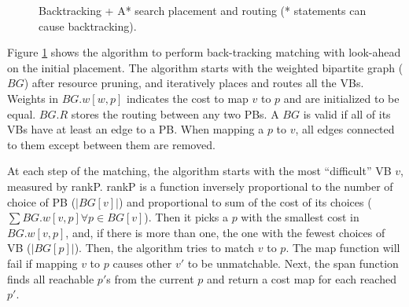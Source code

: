 \begin{figure}[!ht]
  \raggedleft
  \caption{Backtracking + A* search placement and routing (* statements can cause backtracking).}
  \label{alg:backtrack}
\end{figure}

Figure \ref{alg:backtrack} shows the algorithm to perform back-tracking matching with look-ahead on the initial
placement. The algorithm starts with the weighted bipartite graph ($BG$) after resource pruning, and iteratively
places and routes all the VBs. Weights in $BG.w[w,p]$ indicates the cost to map $v$ to $p$ and are initialized to be
equal. $BG.R$ stores the routing between any two PBs. A $BG$ is valid if all of its VBs have at least an edge to a PB.
When mapping a $p$ to $v$, all edges connected to them except between them are removed. 

At each step of the matching, the algorithm starts with the most ``difficult'' VB $v$, measured by
{\sc rankP}. {\sc rankP} is a function inversely proportional to the number of choice of PB ($|BG[v]|$)
and proportional to sum of the cost of its choices ($\sum BG.w[v,p] \forall p \in BG[v]$).
Then it picks a $p$ with the smallest cost in $BG.w[v,p]$, and, if there is more than one, the one with the fewest choices of VB ($|BG[p]|$). 
Then, the algorithm tries to match $v$ to $p$. The {\sc map} function will fail if mapping $v$ to $p$ causes other $v'$ to be unmatchable. 
Next, the {\sc span} function finds all reachable $p'$s from the current $p$ and return
a cost map for each reached $p'$. 

